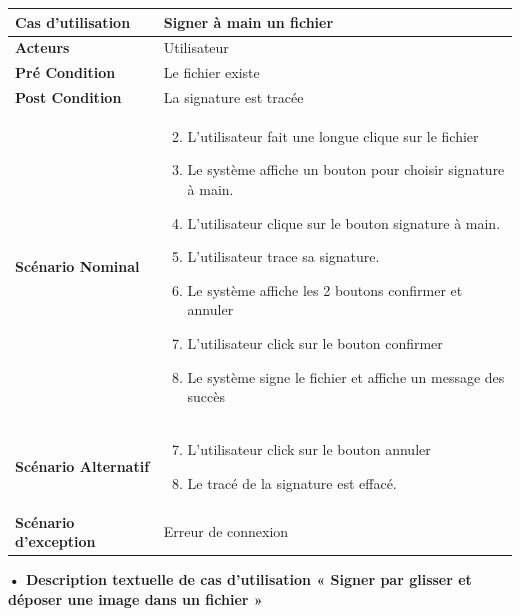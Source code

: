 \begin{longtable}{|p{5cm}|p{10cm}|}
\hline
\textbf{Cas d'utilisation}&Signer à main un fichier\\
\hline
\textbf{Acteurs}&Utilisateur\\
\hline
\textbf{Pré Condition}&Le fichier existe\\
\hline
\textbf{Post Condition}&La signature est tracée\\
\hline
\textbf{Scénario Nominal}&
\vspace{-\baselineskip}
\begin{enumerate}
    \setcounter{enumi}{1}
  \item L'utilisateur fait une longue clique sur le fichier
  \item Le système affiche un bouton pour choisir signature à main. 
  \item L'utilisateur clique sur le bouton signature à main.
  \item L'utilisateur trace sa signature.
  \item Le système affiche les 2 boutons confirmer et annuler
  \item L'utilisateur click sur le bouton confirmer
  \item Le système signe le fichier et affiche un message des succès
\end{enumerate}\\
\hline
\textbf{Scénario Alternatif}&
\vspace{-\baselineskip}
\begin{enumerate}
    \setcounter{enumi}{6}
    \item L'utilisateur click sur le bouton annuler
    \item Le tracé de la signature est effacé.
\end{enumerate}\\
\hline
\textbf{Scénario d'exception}&Erreur de connexion\\
\hline
\end{longtable}

\textbf{•	Description textuelle de cas d'utilisation « Signer par glisser et déposer une image dans un fichier »}

